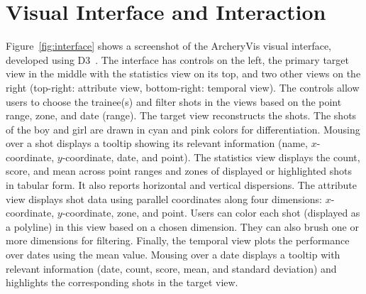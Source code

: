 \documentclass[runningheads]{llncs}
\newcommand{\hot}[1]{{\color{red} #1}}
\begin{document}
\section{Visual Interface and Interaction}

Figure~\ref{fig:interface} shows a screenshot of the ArcheryVis visual interface, developed using D3~\cite{D3-online}. 
The interface has controls on the left, the primary target view in the middle with the statistics view on its top, and two other views on the right (top-right: attribute view, bottom-right: temporal view).  
%
The controls allow users to choose the trainee(s) and filter shots in the views based on the point range, zone, and date (range). 
The target view reconstructs the shots. The shots of the boy and girl are drawn in cyan and pink colors for differentiation. Mousing over a shot displays a tooltip showing its relevant information (name, $x$-coordinate, $y$-coordinate, date, and point). 
%
The statistics view displays the count, score, and mean across point ranges and zones of displayed or highlighted shots in tabular form. It also reports horizontal and vertical dispersions. 
%
The attribute view displays shot data using parallel coordinates along four dimensions: $x$-coordinate, $y$-coordinate, zone, and point. Users can color each shot (displayed as a polyline) in this view based on a chosen dimension. They can also brush one or more dimensions for filtering. 
%
Finally, the temporal view plots the performance over dates using the mean value. Mousing over a date displays a tooltip with relevant information (date, count, score, mean, and standard deviation) and highlights the corresponding shots in the target view. 

\end{document}
